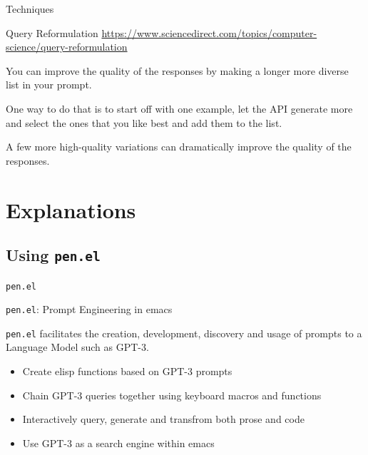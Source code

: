 \documentclass[presentation]{beamer}
\begin{document}
\begin{frame}[label={sec:org84e52ec}]{Techniques}
\begin{block}{Query Reformulation}
\url{https://www.sciencedirect.com/topics/computer-science/query-reformulation}

You can improve the quality of the responses
by making a longer more diverse list in your
prompt.

One way to do that is to start off with one
example, let the API generate more and select
the ones that you like best and add them to
the list.

A few more high-quality variations can
dramatically improve the quality of the
responses.
\end{block}
\end{frame}

\section{Explanations}
\label{sec:org519c8e8}
\subsection{Using \texttt{pen.el}}
\label{sec:org03d3a21}
\begin{frame}[label={sec:org694a266},fragile]{\texttt{pen.el}}
 \begin{block}{\texttt{pen.el}: Prompt Engineering in emacs}
{\footnotesize
\texttt{pen.el} facilitates the creation,
development, discovery and usage of prompts to
a Language Model such as GPT-3.

\begin{itemize}
\item Create elisp functions based on GPT-3 prompts
\item Chain GPT-3 queries together using keyboard macros and functions
\item Interactively query, generate and transfrom both prose and code
\item Use GPT-3 as a search engine within emacs
\end{itemize}
}
\end{block}
\end{frame}
\end{document}
